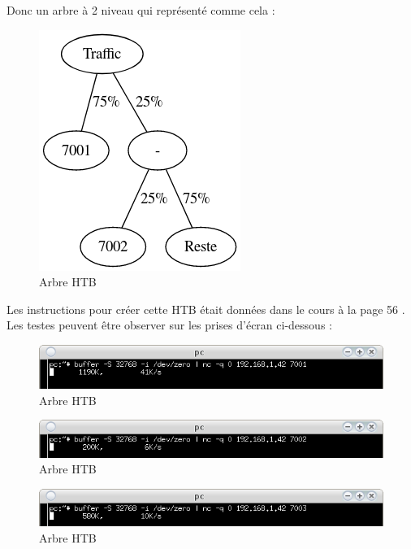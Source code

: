 \documentclass{article}
\begin{document}
Donc un arbre à 2 niveau qui représenté comme cela :

\begin{figure}[h]
	\centering
	\includegraphics{./arbre-htb.png}
	\caption{Arbre HTB}
	\label{fig:htb-tree}
\end{figure}

Les instructions pour créer cette HTB était données dans le cours à la page 56 \cite{doc-labo}. \\

Les testes peuvent être observer sur les prises d'écran ci-dessous : 

\begin{figure}[h]
	\centering
	\includegraphics{./captures/htb1.png}
	\caption{Arbre HTB}
	\label{fig:Débit port 7001}
\end{figure}

\begin{figure}[h]
	\centering
	\includegraphics{./captures/htb2.png}
	\caption{Arbre HTB}
	\label{fig:Débit port 7002}
\end{figure}

\begin{figure}[h]
	\centering
	\includegraphics{./captures/htb3.png}
	\caption{Arbre HTB}
	\label{fig:Débit port 7003}
\end{figure}
\end{document}
